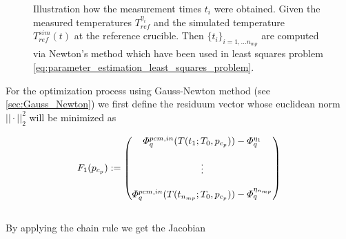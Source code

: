 \documentclass{scrartcl}[12pt, halfparskip]
\numberwithin{equation}{section}
\numberwithin{figure}{section}
\numberwithin{table}{section}
\begin{document}
\begin{figure}[H]
	\centering
	\caption{Illustration how the measurement times $t_i$ were obtained. Given the measured temperatures $T_{ref}^{\eta_i}$ and the simulated temperature $T_{ref}^{sim}(t)$ at the reference crucible. Then $\{ t_i \}_{i=1,...n_{mp}}$ are computed via Newton's method which have been used in least squares problem \cref{eq:parameter_estimation_least_squares_problem}.}
	\label{fig:obtaining_measurement_times}
\end{figure}


For the optimization process using Gauss-Newton method (see \cref{sec:Gauss_Newton}) we first define the residuum vector whose euclidean norm $|| \cdot ||_2^2$ will be minimized as 

\begin{equation}
	F_1(p_{c_p}) :=
	\begin{pmatrix}
		\varPhi_{q}^{pcm,in}(T(t_1;T_0,p_{c_p})) - \varPhi_q^{\eta_1} \\
		\textcolor{white}{} \\
		\vdots \\
		\textcolor{white}{} \\
		\varPhi_{q}^{pcm,in}(T(t_{n_{mp}};T_0,p_{c_p})) - \varPhi_q^{\eta_{n_{mp}}}
	\end{pmatrix}
\end{equation} \\


By applying the chain rule we get the Jacobian
\end{document}
